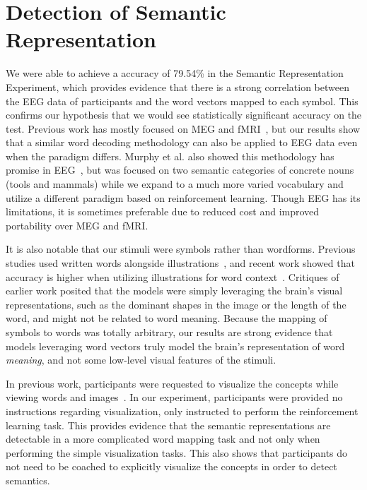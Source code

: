 
\section{Detection of Semantic Representation}
\label{sec:discussion:detectionofsemanticrepresentation}
We were able to achieve a \tvt accuracy of 79.54\% in the Semantic Representation Experiment, which provides evidence that there is a strong correlation between the EEG data of participants and the word vectors mapped to each symbol. This confirms our hypothesis that we would see statistically significant accuracy on the \tvt test. Previous work has mostly focused on MEG and fMRI~\cite{Mitchell2008,Sudre2012}, but our results show that a similar word decoding methodology can also be applied to EEG data even when the paradigm differs. Murphy et al. also showed this methodology has promise in EEG~\cite{Murphy2009}, but was focused on two semantic categories of concrete nouns (tools and mammals) while we expand to a much more varied vocabulary and utilize a different paradigm based on reinforcement learning. Though EEG has its limitations, it is sometimes preferable due to reduced cost and improved portability over MEG and fMRI.

It is also notable that our stimuli were symbols rather than wordforms. Previous studies used written words alongside illustrations~\cite{Mitchell2008,Sudre2012}, and recent work showed that accuracy is higher when utilizing illustrations for word context~\cite{pereira2018toward}. Critiques of earlier work posited that the models were simply leveraging the brain's visual representations, such as the dominant shapes in the image or the length of the word, and might not be related to word meaning. Because the mapping of symbols to words was totally arbitrary, our results are strong evidence that models leveraging word vectors truly model the brain's representation of word \emph{meaning}, and not some low-level visual features of the stimuli.

In previous work, participants were requested to visualize the concepts while viewing words and images~\cite{Mitchell2008,Sudre2012}. In our experiment, participants were provided no instructions regarding visualization, only instructed to perform the reinforcement learning task. This provides evidence that the semantic representations are detectable in a more complicated word mapping task and not only when performing the simple visualization tasks. This also shows that participants do not need to be coached to explicitly visualize the concepts in order to detect semantics.

